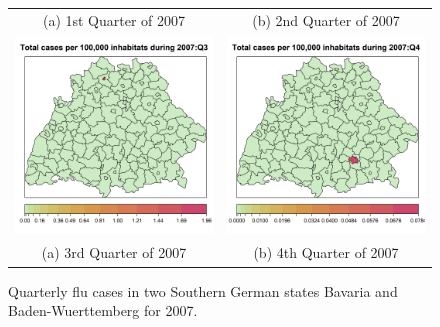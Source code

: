 \begin{figure}[H]
{\begin{tabular}{cc}
			(a) 1st Quarter of 2007  &  (b) 2nd Quarter of 2007   \\
			\includegraphics[scale = 0.5, trim = 0 0 0 0]{flu2007q3.png} &
			\includegraphics[scale = 0.5, trim = 0 0 0 0]{flu2007q4.png} \\
			(a) 3rd Quarter of 2007  &  (b) 4th Quarter of 2007   \\
		\end{tabular}
	}
	\caption{Quarterly flu cases in  two Southern German states Bavaria and Baden-Wuerttemberg for 2007.}
	\label{flu}
\end{figure}



